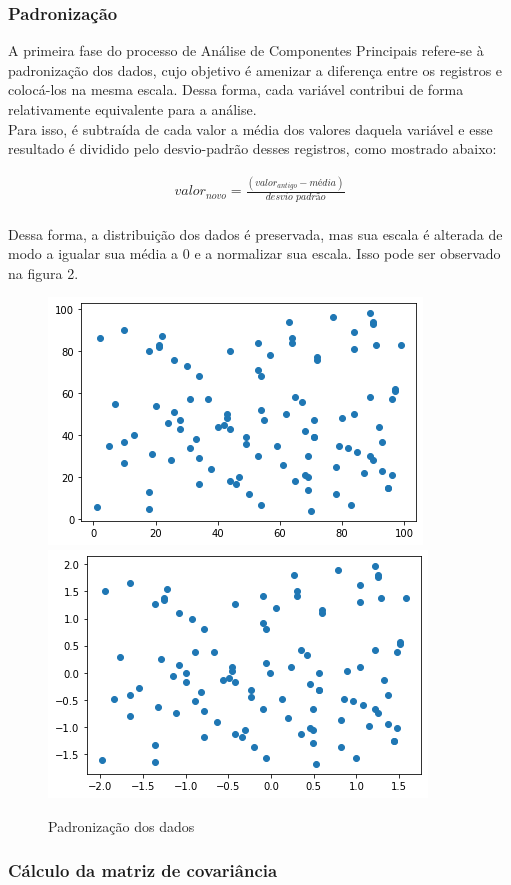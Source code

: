 \documentclass{article}
\begin{document}
\subsubsection{Padronização}

A primeira fase do processo de Análise de Componentes Principais refere-se à padronização dos dados, cujo objetivo é amenizar a diferença entre os registros e colocá-los na mesma escala. Dessa forma, cada variável contribui de forma relativamente equivalente para a análise.\\

Para isso, é subtraída de cada valor a média dos valores daquela variável e esse resultado é dividido pelo desvio-padrão desses registros, como mostrado abaixo:

\begin{align*}
    valor_{novo} = \frac{(valor_{antigo} - \textit{média})}{\textit{desvio padrão}}
\end{align*}
\\

Dessa forma, a distribuição dos dados é preservada, mas sua escala é alterada de modo a igualar sua média a 0 e a normalizar sua escala. Isso pode ser observado na figura 2.

\begin{figure}[h]
    \centering
    \includegraphics[width=0.4\linewidth]{Figure 2023-11-09 104557.png}
    \includegraphics[width=0.4\linewidth]{Figure 2023-11-09 104605.png}
    \caption{Padronização dos dados}
    \label{fig:enter-label}
\end{figure}

\subsubsection{Cálculo da matriz de covariância}
\end{document}
